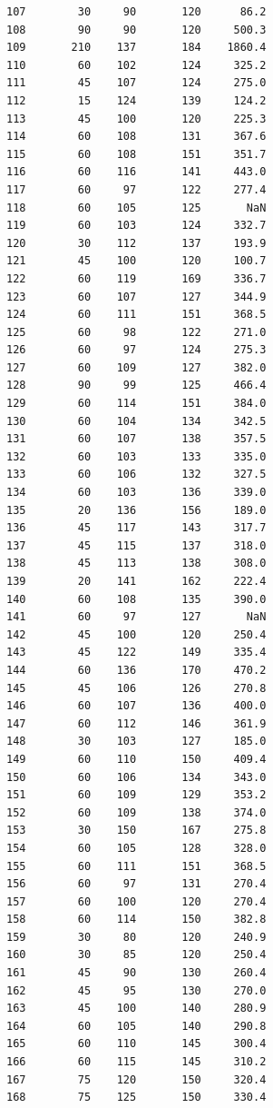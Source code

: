 \begin{code}
\begin{verbatim}
107        30     90       120      86.2
108        90     90       120     500.3
109       210    137       184    1860.4
110        60    102       124     325.2
111        45    107       124     275.0
112        15    124       139     124.2
113        45    100       120     225.3
114        60    108       131     367.6
115        60    108       151     351.7
116        60    116       141     443.0
117        60     97       122     277.4
118        60    105       125       NaN
119        60    103       124     332.7
120        30    112       137     193.9
121        45    100       120     100.7
122        60    119       169     336.7
123        60    107       127     344.9
124        60    111       151     368.5
125        60     98       122     271.0
126        60     97       124     275.3
127        60    109       127     382.0
128        90     99       125     466.4
129        60    114       151     384.0
130        60    104       134     342.5
131        60    107       138     357.5
132        60    103       133     335.0
133        60    106       132     327.5
134        60    103       136     339.0
135        20    136       156     189.0
136        45    117       143     317.7
137        45    115       137     318.0
138        45    113       138     308.0
139        20    141       162     222.4
140        60    108       135     390.0
141        60     97       127       NaN
142        45    100       120     250.4
143        45    122       149     335.4
144        60    136       170     470.2
145        45    106       126     270.8
146        60    107       136     400.0
147        60    112       146     361.9
148        30    103       127     185.0
149        60    110       150     409.4
150        60    106       134     343.0
151        60    109       129     353.2
152        60    109       138     374.0
153        30    150       167     275.8
154        60    105       128     328.0
155        60    111       151     368.5
156        60     97       131     270.4
157        60    100       120     270.4
158        60    114       150     382.8
159        30     80       120     240.9
160        30     85       120     250.4
161        45     90       130     260.4
162        45     95       130     270.0
163        45    100       140     280.9
164        60    105       140     290.8
165        60    110       145     300.4
166        60    115       145     310.2
167        75    120       150     320.4
168        75    125       150     330.4
\end{verbatim}
\end{code}

